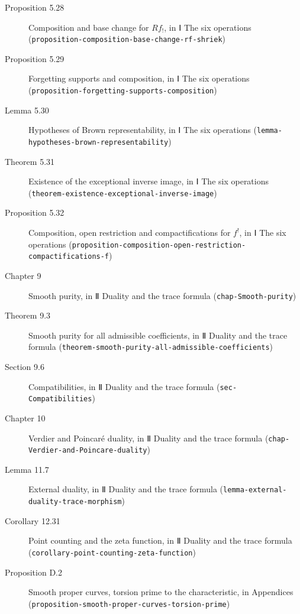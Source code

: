 \documentclass[11pt]{article}
\newcommand{\bpslug}[1]{\texttt{#1}}
\begin{document}
\begin{description}
\item[Proposition 5.28] Composition and base change for $Rf_!$, in Ⅰ The six operations (\bpslug{proposition-{}\allowbreak{}composition-{}\allowbreak{}base-{}\allowbreak{}change-{}\allowbreak{}rf-{}\allowbreak{}shriek})
\item[Proposition 5.29] Forgetting supports and composition, in Ⅰ The six operations (\bpslug{proposition-{}\allowbreak{}forgetting-{}\allowbreak{}supports-{}\allowbreak{}composition})
\item[Lemma 5.30] Hypotheses of Brown representability, in Ⅰ The six operations (\bpslug{lemma-{}\allowbreak{}hypotheses-{}\allowbreak{}brown-{}\allowbreak{}representability})
\item[Theorem 5.31] Existence of the exceptional inverse image, in Ⅰ The six operations (\bpslug{theorem-{}\allowbreak{}existence-{}\allowbreak{}exceptional-{}\allowbreak{}inverse-{}\allowbreak{}image})
\item[Proposition 5.32] Composition, open restriction and compactifications for $f^!$, in Ⅰ The six operations (\bpslug{proposition-{}\allowbreak{}composition-{}\allowbreak{}open-{}\allowbreak{}restriction-{}\allowbreak{}compactifications-{}\allowbreak{}f})
\item[Chapter 9] Smooth purity, in Ⅱ Duality and the trace formula (\bpslug{chap-{}\allowbreak{}Smooth-{}\allowbreak{}purity})
\item[Theorem 9.3] Smooth purity for all admissible coefficients, in Ⅱ Duality and the trace formula (\bpslug{theorem-{}\allowbreak{}smooth-{}\allowbreak{}purity-{}\allowbreak{}all-{}\allowbreak{}admissible-{}\allowbreak{}coefficients})
\item[Section 9.6] Compatibilities, in Ⅱ Duality and the trace formula (\bpslug{sec-{}\allowbreak{}Compatibilities})
\item[Chapter 10] Verdier and Poincaré duality, in Ⅱ Duality and the trace formula (\bpslug{chap-{}\allowbreak{}Verdier-{}\allowbreak{}and-{}\allowbreak{}Poincare-{}\allowbreak{}duality})
\item[Lemma 11.7] External duality, in Ⅱ Duality and the trace formula (\bpslug{lemma-{}\allowbreak{}external-{}\allowbreak{}duality-{}\allowbreak{}trace-{}\allowbreak{}morphism})
\item[Corollary 12.31] Point counting and the zeta function, in Ⅱ Duality and the trace formula (\bpslug{corollary-{}\allowbreak{}point-{}\allowbreak{}counting-{}\allowbreak{}zeta-{}\allowbreak{}function})
\item[Proposition D.2] Smooth proper curves, torsion prime to the characteristic, in Appendices (\bpslug{proposition-{}\allowbreak{}smooth-{}\allowbreak{}proper-{}\allowbreak{}curves-{}\allowbreak{}torsion-{}\allowbreak{}prime})
\end{description}
\clearpage{}%
\end{document}

